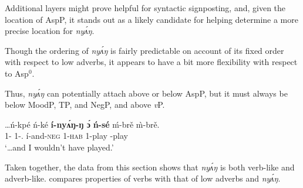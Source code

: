 \documentclass[output=paper,modfonts,nonflat,
hidelinks
]{langsci/langscibook}
\begin{document}
\noindent Additional layers might prove helpful for syntactic signposting, and, given the location of AspP, it stands out as a likely candidate for helping determine a more precise location for \textit{ny\'{ʌ}ŋ}.

Though the ordering of \textit{ny\'{ʌ}ŋ} is fairly predictable on account of its fixed order with respect to low adverbs, it appears to have a bit more flexibility with respect to Asp$^0$.

\ea\label{ex:duncan-et-al:24}
\z
\z

\noindent Thus, \textit{ny\'{ʌ}ŋ} can potentially attach above or below AspP, but it must always be below MoodP, TP, and NegP, and above \textit{v}P.

\ea\label{ex:duncan-et-al:25}
\gll \ldots ń-kpé ń-ké \textbf{í-ny\'{ʌ}ŋ-ŋ \'ɔ} \textbf{ń-sé} \'{m}-br\v{e} \`{m}-br\v{e}. \\
1{\SG-\COND} 1{\SG-\PST.\FOC} í-and-\textsc{neg} 1{\SG}-\textsc{hab} 1{\SG}-play {\NMLZ}-play \\
\glt `\ldots and I wouldn't have played.'
\z

Taken together, the data from this section shows that \textit{ny\'{ʌ}ŋ} is both verb-like and adverb-like.  compares properties of verbs with that of low adverbs and \textit{ny\'{ʌ}ŋ}.

\begin{table}
\caption{Properties of verbs, low adverbs, and \textit{ny\'{ʌ}ŋ}.}
\label{tab:2:properties}
\end{table}
\end{document}
